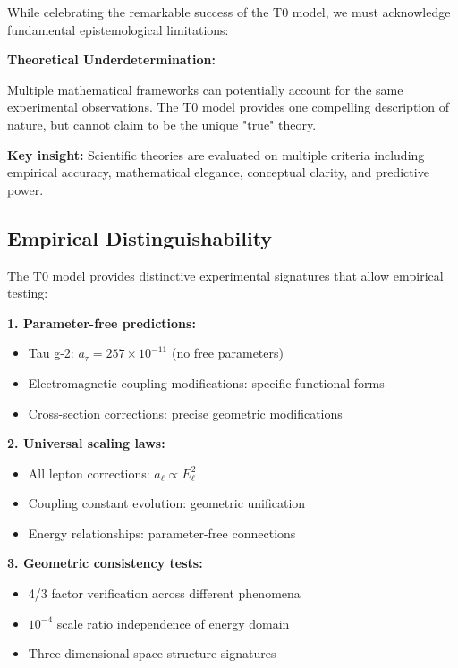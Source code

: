 \documentclass[12pt,a4paper]{report}
\begin{document}
While celebrating the remarkable success of the T0 model, we must acknowledge fundamental epistemological limitations:

\begin{tcolorbox}[colback=yellow!5!white,colframe=orange!75!black,title=Epistemological Humility]
	\textbf{Theoretical Underdetermination:}
	
	Multiple mathematical frameworks can potentially account for the same experimental observations. The T0 model provides one compelling description of nature, but cannot claim to be the unique "true" theory.
	
	\textbf{Key insight:} Scientific theories are evaluated on multiple criteria including empirical accuracy, mathematical elegance, conceptual clarity, and predictive power.
\end{tcolorbox}

\subsection{Empirical Distinguishability}
\label{subsec:empirical_distinguishability}

The T0 model provides distinctive experimental signatures that allow empirical testing:

\textbf{1. Parameter-free predictions:}
\begin{itemize}
	\item Tau g-2: $a_\tau = 257 \times 10^{-11}$ (no free parameters)
	\item Electromagnetic coupling modifications: specific functional forms
	\item Cross-section corrections: precise geometric modifications
\end{itemize}

\textbf{2. Universal scaling laws:}
\begin{itemize}
	\item All lepton corrections: $a_\ell \propto E_\ell^2$
	\item Coupling constant evolution: geometric unification
	\item Energy relationships: parameter-free connections
\end{itemize}

\textbf{3. Geometric consistency tests:}
\begin{itemize}
	\item 4/3 factor verification across different phenomena
	\item $10^{-4}$ scale ratio independence of energy domain
	\item Three-dimensional space structure signatures
\end{itemize}
\end{document}
